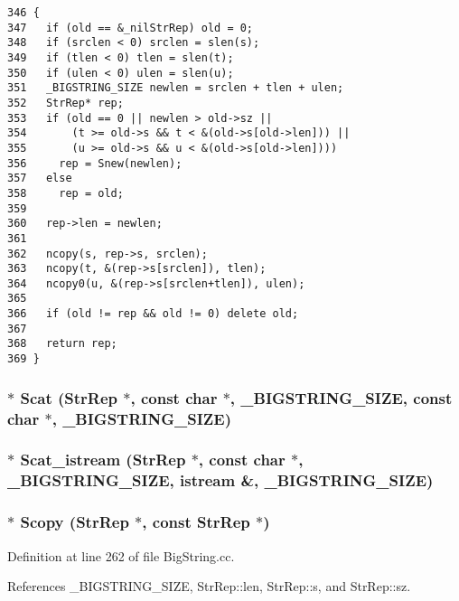 \footnotesize\begin{verbatim}346 {
347   if (old == &_nilStrRep) old = 0;
348   if (srclen < 0) srclen = slen(s);
349   if (tlen < 0) tlen = slen(t);
350   if (ulen < 0) ulen = slen(u);
351   _BIGSTRING_SIZE newlen = srclen + tlen + ulen;
352   StrRep* rep;
353   if (old == 0 || newlen > old->sz || 
354       (t >= old->s && t < &(old->s[old->len])) ||
355       (u >= old->s && u < &(old->s[old->len])))
356     rep = Snew(newlen);
357   else
358     rep = old;
359 
360   rep->len = newlen;
361 
362   ncopy(s, rep->s, srclen);
363   ncopy(t, &(rep->s[srclen]), tlen);
364   ncopy0(u, &(rep->s[srclen+tlen]), ulen);
365 
366   if (old != rep && old != 0) delete old;
367 
368   return rep;
369 }
\end{verbatim}\normalsize 
{}
\subsubsection{$\ast$ Scat ({\bf Str\-Rep} $\ast$, const char $\ast$, {\bf \_\-BIGSTRING\_\-SIZE}, const char $\ast$, {\bf \_\-BIGSTRING\_\-SIZE})}\label{BigString_8hh_a18}


\subsubsection{$\ast$ Scat\_\-istream ({\bf Str\-Rep} $\ast$, const char $\ast$, {\bf \_\-BIGSTRING\_\-SIZE}, istream \&, {\bf \_\-BIGSTRING\_\-SIZE})}\label{BigString_8hh_a26}


\subsubsection{$\ast$ Scopy ({\bf Str\-Rep} $\ast$, const {\bf Str\-Rep} $\ast$)}\label{BigString_8hh_a17}




Definition at line 262 of file Big\-String.cc.

References \_\-BIGSTRING\_\-SIZE, Str\-Rep::len, Str\-Rep::s, and Str\-Rep::sz.

